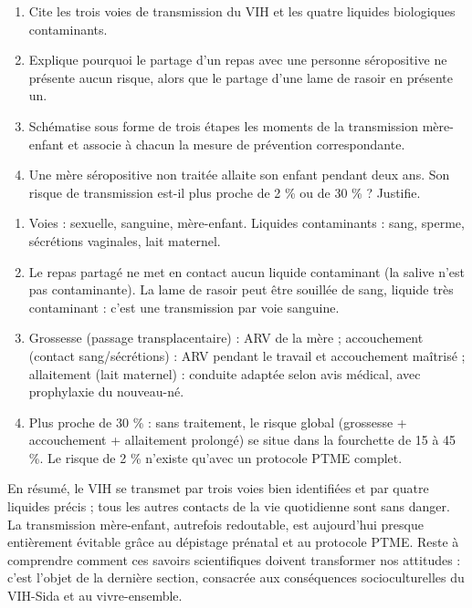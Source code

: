 \documentclass[11pt]{article}
\begin{document}
\begin{exercice}
\begin{enumerate}
\item Cite les trois voies de transmission du VIH et les quatre liquides biologiques contaminants.
\item Explique pourquoi le partage d'un repas avec une personne séropositive ne présente aucun risque, alors que le partage d'une lame de rasoir en présente un.
\item Schématise sous forme de trois étapes les moments de la transmission mère-enfant et associe à chacun la mesure de prévention correspondante.
\item Une mère séropositive non traitée allaite son enfant pendant deux ans. Son risque de transmission est-il plus proche de 2 \% ou de 30 \% ? Justifie.
\end{enumerate}
\end{exercice}

\begin{corrige}[Exercice]
\begin{enumerate}
\item Voies : sexuelle, sanguine, mère-enfant. Liquides contaminants : sang, sperme, sécrétions vaginales, lait maternel.
\item Le repas partagé ne met en contact aucun liquide contaminant (la salive n'est pas contaminante). La lame de rasoir peut être souillée de sang, liquide très contaminant : c'est une transmission par voie sanguine.
\item Grossesse (passage transplacentaire) : ARV de la mère ; accouchement (contact sang/sécrétions) : ARV pendant le travail et accouchement maîtrisé ; allaitement (lait maternel) : conduite adaptée selon avis médical, avec prophylaxie du nouveau-né.
\item Plus proche de 30 \% : sans traitement, le risque global (grossesse + accouchement + allaitement prolongé) se situe dans la fourchette de 15 à 45 \%. Le risque de 2 \% n'existe qu'avec un protocole PTME complet.
\end{enumerate}
\end{corrige}

En résumé, le VIH se transmet par trois voies bien identifiées et par quatre liquides précis ; tous les autres contacts de la vie quotidienne sont sans danger. La transmission mère-enfant, autrefois redoutable, est aujourd'hui presque entièrement évitable grâce au dépistage prénatal et au protocole PTME. Reste à comprendre comment ces savoirs scientifiques doivent transformer nos attitudes : c'est l'objet de la dernière section, consacrée aux conséquences socioculturelles du VIH-Sida et au vivre-ensemble.
\end{document}
